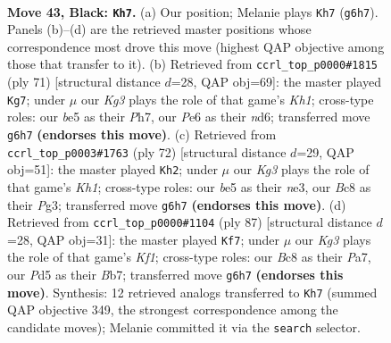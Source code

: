 \documentclass[11pt]{article}
\begin{document}
\clearpage

\begin{figure}[p]\centering
\begin{subfigure}{0.46\textwidth}\centering
\resizebox{\linewidth}{!}{%
\newchessgame
\chessboard[
  setfen={r1bN4/8/2P1p1k1/Pp1pB3/8/1nP2K2/8/6R1 b - - 9 43},
  showmover=false,
  pgfstyle=straightmove, color=movearrow, markmove={g6-h7}
]}
\caption{}
\end{subfigure}\hfill
\begin{subfigure}{0.46\textwidth}\centering
\resizebox{\linewidth}{!}{%
\newchessgame
\chessboard[
  setfen={2R4k/p6p/3N2p1/3nP3/8/3B1KP1/br5P/8 b - - 3 36},
  showmover=false,
  pgfstyle=straightmove, color=movearrow, markmove={h8-g7}
]}
\caption{}
\end{subfigure}
\\[4pt]
\begin{subfigure}{0.46\textwidth}\centering
\resizebox{\linewidth}{!}{%
\newchessgame
\chessboard[
  setfen={6k1/1R3p2/5P1p/p1b5/5B2/4nPPB/8/r6K w - - 5 37},
  showmover=false,
  pgfstyle=straightmove, color=movearrow, markmove={h1-h2}
]}
\caption{}
\end{subfigure}\hfill
\begin{subfigure}{0.46\textwidth}\centering
\resizebox{\linewidth}{!}{%
\newchessgame
\chessboard[
  setfen={5k2/pb5N/1p4p1/8/rPP5/7P/4R1P1/6K1 b - - 0 44},
  showmover=false,
  pgfstyle=straightmove, color=movearrow, markmove={f8-f7}
]}
\caption{}
\end{subfigure}
\caption{\textbf{Move 43, Black: \texttt{Kh7}.} (a) Our position; Melanie plays \texttt{Kh7} (\texttt{g6h7}). Panels (b)--(d) are the retrieved master positions whose correspondence most drove this move (highest QAP objective among those that transfer to it). (b) Retrieved from \texttt{ccrl\_top\_p0000\#1815} (ply 71) [structural distance $d$=28, QAP obj=69]: the master played \texttt{Kg7}; under $\mu$ our \emph{Kg3} plays the role of that game's \emph{Kh1}; cross-type roles: our \emph{b}e5 as their \emph{P}h7, our \emph{P}e6 as their \emph{n}d6; transferred move \texttt{g6h7} \textbf{(endorses this move)}. (c) Retrieved from \texttt{ccrl\_top\_p0003\#1763} (ply 72) [structural distance $d$=29, QAP obj=51]: the master played \texttt{Kh2}; under $\mu$ our \emph{Kg3} plays the role of that game's \emph{Kh1}; cross-type roles: our \emph{b}e5 as their \emph{n}e3, our \emph{B}c8 as their \emph{P}g3; transferred move \texttt{g6h7} \textbf{(endorses this move)}. (d) Retrieved from \texttt{ccrl\_top\_p0000\#1104} (ply 87) [structural distance $d$=28, QAP obj=31]: the master played \texttt{Kf7}; under $\mu$ our \emph{Kg3} plays the role of that game's \emph{Kf1}; cross-type roles: our \emph{B}c8 as their \emph{P}a7, our \emph{P}d5 as their \emph{B}b7; transferred move \texttt{g6h7} \textbf{(endorses this move)}. Synthesis: 12 retrieved analogs transferred to \texttt{Kh7} (summed QAP objective 349, the strongest correspondence among the candidate moves); Melanie committed it via the \texttt{search} selector.}
\label{fig:thought-m85}
\end{figure}
\end{document}
